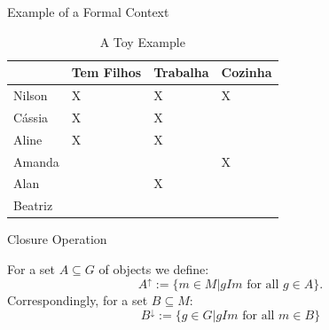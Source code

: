 \documentclass[pdf,xcolor=table]{beamer}
\begin{document}
\begin{frame}[t]{Example of a Formal Context}
    \begin{table}[]
        \tiny
        \centering
        \caption{A Toy Example}
        \begin{tabular}{@{}|l|l|l|l|@{}} \hline
                    & Tem Filhos & Trabalha & Cozinha \\\hline
            Nilson  & X          & X        & X       \\\hline
            Cássia  & X          & X        &         \\\hline
            Aline   & X          & X        &         \\\hline
            Amanda  &            &          & X       \\\hline
            Alan    &            & X        &         \\\hline
            Beatriz &            &          &         \\\hline
        \end{tabular}
    \end{table}
\end{frame}

\begin{frame}[t]{Closure Operation}
    \begin{definition}
        For a set $A \subseteq G$ of objects we define: \\
        \begin{equation}
            A^\uparrow := \{m \in M | gIm \text{ for all } g \in A\}.
        \end{equation}
        Correspondingly, for a set $B \subseteq M$:
        \begin{equation}
            B^\downarrow := \{g \in G | gIm \text{ for all } m \in B\}
        \end{equation}
    \end{definition}
\end{frame}
\end{document}
